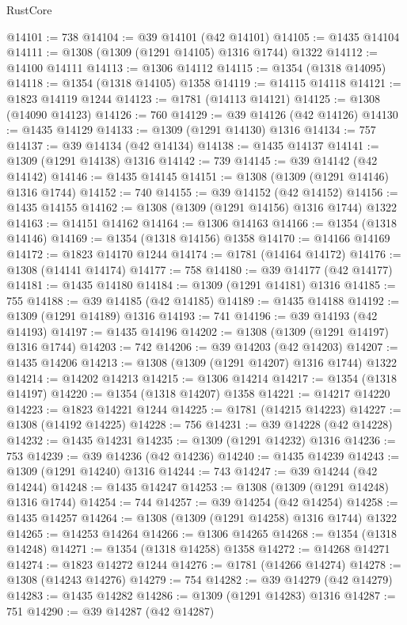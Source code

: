 \begin{lexlean}{RustCore}
\begin{coremodule}
@14101 := 738
@14104 := @39 @14101 (@42 @14101)
@14105 := @1435 @14104
@14111 := @1308 (@1309 (@1291 @14105) @1316 @1744) @1322
@14112 := @14100 @14111
@14113 := @1306 @14112
@14115 := @1354 (@1318 @14095)
@14118 := @1354 (@1318 @14105) @1358
@14119 := @14115 @14118
@14121 := @1823 @14119 @1244
@14123 := @1781 (@14113 @14121)
@14125 := @1308 (@14090 @14123)
@14126 := 760
@14129 := @39 @14126 (@42 @14126)
@14130 := @1435 @14129
@14133 := @1309 (@1291 @14130) @1316
@14134 := 757
@14137 := @39 @14134 (@42 @14134)
@14138 := @1435 @14137
@14141 := @1309 (@1291 @14138) @1316
@14142 := 739
@14145 := @39 @14142 (@42 @14142)
@14146 := @1435 @14145
@14151 := @1308 (@1309 (@1291 @14146) @1316 @1744)
@14152 := 740
@14155 := @39 @14152 (@42 @14152)
@14156 := @1435 @14155
@14162 := @1308 (@1309 (@1291 @14156) @1316 @1744) @1322
@14163 := @14151 @14162
@14164 := @1306 @14163
@14166 := @1354 (@1318 @14146)
@14169 := @1354 (@1318 @14156) @1358
@14170 := @14166 @14169
@14172 := @1823 @14170 @1244
@14174 := @1781 (@14164 @14172)
@14176 := @1308 (@14141 @14174)
@14177 := 758
@14180 := @39 @14177 (@42 @14177)
@14181 := @1435 @14180
@14184 := @1309 (@1291 @14181) @1316
@14185 := 755
@14188 := @39 @14185 (@42 @14185)
@14189 := @1435 @14188
@14192 := @1309 (@1291 @14189) @1316
@14193 := 741
@14196 := @39 @14193 (@42 @14193)
@14197 := @1435 @14196
@14202 := @1308 (@1309 (@1291 @14197) @1316 @1744)
@14203 := 742
@14206 := @39 @14203 (@42 @14203)
@14207 := @1435 @14206
@14213 := @1308 (@1309 (@1291 @14207) @1316 @1744) @1322
@14214 := @14202 @14213
@14215 := @1306 @14214
@14217 := @1354 (@1318 @14197)
@14220 := @1354 (@1318 @14207) @1358
@14221 := @14217 @14220
@14223 := @1823 @14221 @1244
@14225 := @1781 (@14215 @14223)
@14227 := @1308 (@14192 @14225)
@14228 := 756
@14231 := @39 @14228 (@42 @14228)
@14232 := @1435 @14231
@14235 := @1309 (@1291 @14232) @1316
@14236 := 753
@14239 := @39 @14236 (@42 @14236)
@14240 := @1435 @14239
@14243 := @1309 (@1291 @14240) @1316
@14244 := 743
@14247 := @39 @14244 (@42 @14244)
@14248 := @1435 @14247
@14253 := @1308 (@1309 (@1291 @14248) @1316 @1744)
@14254 := 744
@14257 := @39 @14254 (@42 @14254)
@14258 := @1435 @14257
@14264 := @1308 (@1309 (@1291 @14258) @1316 @1744) @1322
@14265 := @14253 @14264
@14266 := @1306 @14265
@14268 := @1354 (@1318 @14248)
@14271 := @1354 (@1318 @14258) @1358
@14272 := @14268 @14271
@14274 := @1823 @14272 @1244
@14276 := @1781 (@14266 @14274)
@14278 := @1308 (@14243 @14276)
@14279 := 754
@14282 := @39 @14279 (@42 @14279)
@14283 := @1435 @14282
@14286 := @1309 (@1291 @14283) @1316
@14287 := 751
@14290 := @39 @14287 (@42 @14287)

\end{coremodule}
\end{lexlean}
